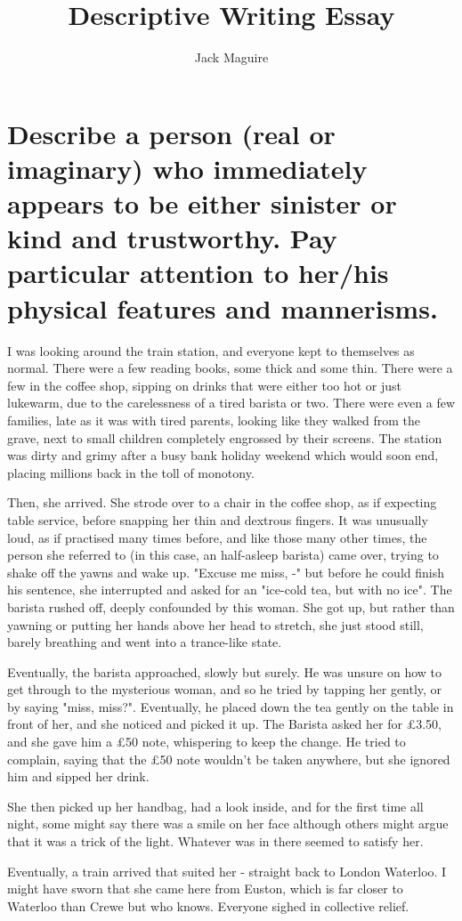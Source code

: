 \documentclass[11pt, oneside]{article}
\title{Descriptive Writing Essay}
\author{Jack Maguire}
\begin{document}
\maketitle
{}

\section {Describe a person (real or imaginary) who immediately appears to be either sinister or kind and trustworthy.  Pay particular attention to her/his physical features and mannerisms.}

I was looking around the train station, and everyone kept to themselves as normal. There were a few reading books, some thick and some thin. There were a few in the coffee shop, sipping on drinks that were either too hot or just lukewarm, due to the carelessness of a tired barista or two. There were even a few families, late as it was with tired parents, looking like they walked from the grave, next to small children completely engrossed by their screens. The station was dirty and grimy after a busy bank holiday weekend which would soon end, placing millions back in the toll of monotony.
\par
Then, she arrived. She strode over to a chair in the coffee shop, as if expecting table service, before snapping her thin and dextrous fingers. It was unusually loud, as if practised many times before, and like those many other times, the person she referred to (in this case, an half-asleep barista) came over, trying to shake off the yawns and wake up. "Excuse me miss, -" but before he could finish his sentence, she interrupted and asked for an "ice-cold tea, but with no ice". The barista rushed off, deeply confounded by this woman. She got up, but rather than yawning or putting her hands above her head to stretch, she just stood still, barely breathing and went into a trance-like state.
\par
Eventually, the barista approached, slowly but surely. He was unsure on how to get through to the mysterious woman, and so he tried by tapping her gently, or by saying "miss, miss?". Eventually, he placed down the tea gently on the table in front of her, and she noticed and picked it up. The Barista asked her for £3.50, and she gave him a £50 note, whispering to keep the change. He tried to complain, saying that the £50 note wouldn't be taken anywhere, but she ignored him and sipped her drink.
\par
She then picked up her handbag, had a look inside, and for the first time all night, some might say there was a smile on her face although others might argue that it was a trick of the light. Whatever was in there seemed to satisfy her.
\par
Eventually, a train arrived that suited her - straight back to London Waterloo. I might have sworn that she came here from Euston, which is far closer to Waterloo than Crewe but who knows. Everyone sighed in collective relief.
\end{document}
